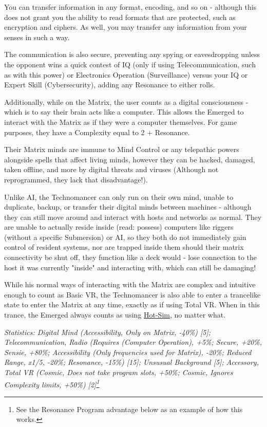 \begin{multicols*}{3}
	You can transfer information in any format, encoding, and so on - although this does not grant you the ability to read formats that are protected, such as encryption and ciphers. As well, you may transfer any information from your senses in such a way.
	
	The communication is also secure, preventing any spying or eavesdropping unless the opponent wins a quick contest of IQ (only if using Telecommunication, such as with this power) or Electronics Operation (Surveillance) versus your IQ or Expert Skill (Cybersecurity), adding any Resonance to either rolls.
	
	Additionally, while on the Matrix, the user counts as a digital consciousness - which is to say their brain acts like a computer. This allows the Emerged to interact with the Matrix as if they were a computer themselves. For game purposes, they have a Complexity equal to 2 + Resonance.
	
	Their Matrix minds are immune to Mind Control or any telepathic powers alongside spells that affect living minds, however they can be hacked, damaged, taken offline, and more by digital threats and viruses (Although not reprogrammed, they lack that disadvantage!). 
	
	Unlike AI, the Technomancer can only run on their own mind, unable to duplicate, backup, or transfer their digital minds between machines - although they can still move around and interact with hosts and networks as normal. They are unable to actually reside inside (read: possess) computers like riggers (without a specific Submersion) or AI, so they both do not immediately gain control of resident systems, nor are trapped inside them should their matrix connectivity be shut off, they function like a deck would - lose connection to the host it was currently "inside" and interacting with, which can still be damaging!
	
	While his normal ways of interacting with the Matrix are complex and intuitive enough to count as Basic VR, the Technomancer is also able to enter a trancelike state to enter the Matrix at any time, exactly as if using Total VR. When in this trance, the Emerged always counts as using \hyperref[sim_mode]{Hot-Sim}, no matter what.
	
	\textit{\textcolor{OliveGreen}{Statistics: Digital Mind (Accessibility, Only on Matrix, -40\%) [5]; Telecommunication, Radio (Requires (Computer Operation), +5\%; Secure, +20\%, Sensie, +80\%; Accessibility (Only frequencies used for Matrix), -20\%; Reduced Range, x1/5, -20\%; Resonance, -15\%) [15]; Unsusual Background [5]; Accessory, Total VR (Cosmic, Does not take program slots, +50\%; Cosmic, Ignores Complexity limits, +50\%) [2]\footnote{See the Resonance Program advantage below as an example of how this works.}}}
	

\end{multicols*}
